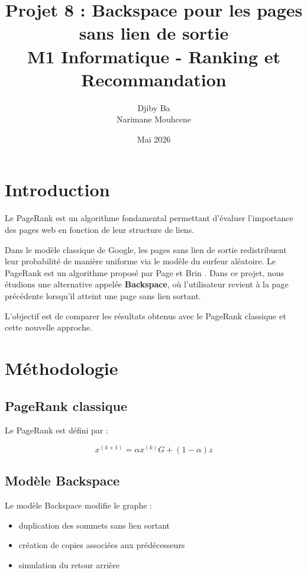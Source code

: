 \documentclass[a4paper,11pt]{article}
\title{\textbf{Projet 8 : Backspace pour les pages sans lien de sortie}\\
\large M1 Informatique - Ranking et Recommandation}
\author{Djiby Ba \\ Narimane Mouhcene}
\date{Mai 2026}
\begin{document}
\RaggedRight 

  

\maketitle

\tableofcontents
\newpage

\section{Introduction}

Le PageRank est un algorithme fondamental permettant d’évaluer l’importance des pages web en fonction de leur structure de liens.

Dans le modèle classique de Google, les pages sans lien de sortie redistribuent leur probabilité de manière uniforme via le modèle du surfeur aléatoire.
Le PageRank est un algorithme proposé par Page et Brin \cite{pagerank}.
Dans ce projet, nous étudions une alternative appelée \textbf{Backspace}, où l’utilisateur revient à la page précédente lorsqu’il atteint une page sans lien sortant.

L’objectif est de comparer les résultats obtenus avec le PageRank classique et cette nouvelle approche.

\section{Méthodologie}

\subsection{PageRank classique}

Le PageRank est défini par :

\[
x^{(k+1)} = \alpha x^{(k)} G + (1 - \alpha) z
\]

\subsection{Modèle Backspace}

Le modèle Backspace modifie le graphe :

\begin{itemize}
    \item duplication des sommets sans lien sortant
    \item création de copies associées aux prédécesseurs
    \item simulation du retour arrière
\end{itemize}
\end{document}
